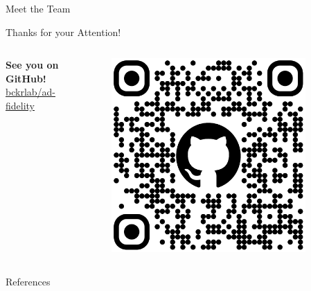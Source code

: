 \documentclass[aspectratio=169,xcolor={table, dvipsnames}]{beamer}
\renewcommand{\emph}[1]{\textbf{#1}}
\begin{document}
\begin{frame}{Meet the Team}
	\centering
	\resizebox{\textwidth}{!}{
		
	}
\end{frame}

\begin{frame}{Thanks for your Attention!}
	\begin{columns}
		\begin{column}{0.5\textwidth}
			\huge
			\emph{See you on GitHub!}
			\href{https://github.com/bckrlab/ad-fidelity}{bckrlab/ad-fidelity}
		\end{column}\hfill
		\begin{column}{0.5\textwidth}
			\begin{figure}
				\href{https://github.com/bckrlab/ad-fidelity}{\includegraphics[width=0.9\textwidth]{figures/github-qr.png}}
			\end{figure}
		\end{column}
	\end{columns}
\end{frame}

\begin{frame}[allowframebreaks]{References}
	\tiny
	\printbibliography[heading=none]
\end{frame}
\end{document}
